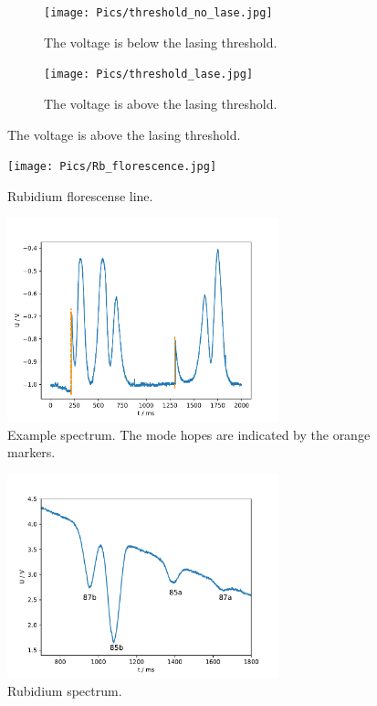 


\begin{figure}
  \centering
  \begin{subfigure}{0.48\textwidth}
    \centering
    \texttt{[image: Pics/threshold\_no\_lase.jpg]}
    \caption{The voltage is below the lasing threshold.}
    \label{fig:no_lase}
  \end{subfigure}
  \begin{subfigure}{0.48\textwidth}
    \centering
    \texttt{[image: Pics/threshold\_lase.jpg]}
    \caption{The voltage is above the lasing threshold.}
    \label{fig:lase}
  \end{subfigure}
\end{figure}


\begin{figure}
  \centering
  \texttt{[image: Pics/Rb\_florescence.jpg]}
  \caption{Rubidium florescense line.}
  \label{fig:florescence}
\end{figure}

\begin{figure}
  \centering
  \includegraphics[width=0.7\textwidth]{Pics/example_spectrum_hop.pdf}
  \caption{Example spectrum. The mode hopes are indicated by the orange markers.}
  \label{fig:example}
\end{figure}

\begin{figure}
  \centering
  \includegraphics[width=0.7\textwidth]{Pics/Rb_spectrum.pdf}
  \caption{Rubidium spectrum.}
  \label{fig:spectrum}
\end{figure}

